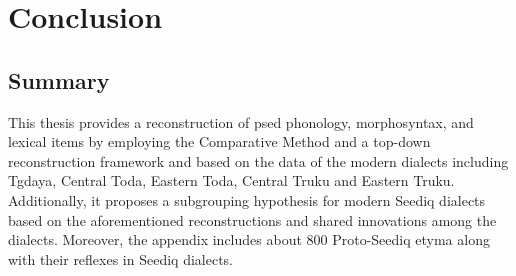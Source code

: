 \chapter{Conclusion}\label{ch8}
\section{Summary}


This thesis provides a reconstruction of \acl{psed} phonology, morphosyntax, and lexical items by employing the Comparative Method and a top-down reconstruction framework and based on the data of the modern dialects including Tgdaya, Central Toda, Eastern Toda, Central Truku and Eastern Truku. Additionally, it proposes a subgrouping hypothesis for modern Seediq dialects based on the aforementioned reconstructions and shared innovations among the dialects. Moreover, the appendix includes about 800 Proto-Seediq etyma along with their reflexes in Seediq dialects.





